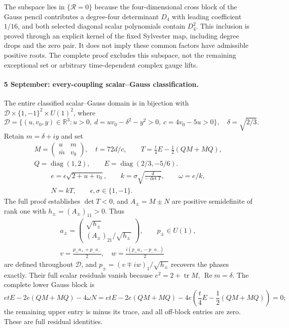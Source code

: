 \documentclass[10pt,letterpaper]{article}
\begin{document}
The subspace lies in $\{\mathscr R=0\}$ because the four-dimensional
cross block of the Gauss pencil contributes a degree-four determinant
$D_4$ with leading coefficient $1/16$, and both selected diagonal scalar
polynomials contain $D_4^2$. This inclusion is proved through an explicit
kernel of the fixed Sylvester map, including degree drops and the zero
pair. It does not imply these common factors have admissible positive roots.
The complete proof excludes this subspace, not the remaining exceptional
set or arbitrary time-dependent complex gauge lifts.

\paragraph{5 September: every-coupling scalar--Gauss classification.}
The entire classified scalar--Gauss domain is in bijection with
$\mathcal D\times\{1,-1\}^2\times U(1)^2$, where
\[
 \mathcal D=\{(u,v_0,y)\in\mathbb R^3:
 u>0,\ d=uv_0-\delta^2-y^2>0,\ c=4v_0-5u>0\},\quad
 \delta=\sqrt{2/3}.
\]
Retain $m=\delta+iy$ and set
\[
 \begin{gathered}
 M=\begin{pmatrix}u&m\\\bar m&v_0\end{pmatrix},\quad t=72d/c,\qquad
 T=\frac t4E-\frac12(QM+MQ),\\
 Q=\operatorname{diag}(1,2),\qquad E=\operatorname{diag}(2/3,-5/6).
 \end{gathered}
\]
\[
 \begin{gathered}
 e=\epsilon\sqrt{2+u+v_0},\qquad
 k=\sigma\sqrt{\frac d{-\det T}},\qquad
 \omega=e/k,\\
 N=kT,\qquad \epsilon,\sigma\in\{1,-1\}.
 \end{gathered}
\]
The full proof establishes $\det T<0$, and $A_\pm=M\pm N$ are
positive semidefinite of rank one with $h_\pm=(A_\pm)_{11}>0$. Thus
\[
 \begin{gathered}
 a_\pm=\begin{pmatrix}\sqrt{h_\pm}\\(A_\pm)_{21}/\sqrt{h_\pm}\end{pmatrix},\qquad
 p_\pm\in U(1),\\
 v=\frac{p_+a_++p_-a_-}2,\quad
 w=\frac{i(p_+a_+-p_-a_-)}2
 \end{gathered}
\]
are defined throughout $\mathcal D$, and
$p_\pm=(v\mp iw)_1/\sqrt{h_\pm}$ recovers the phases exactly.
Their full scalar residuals vanish because
$e^2=2+\operatorname{tr}M$, $\operatorname{Re}m=\delta$.
The complete lower Gauss block is
\[
 etE-2e(QM+MQ)-4\omega N
 =etE-2e(QM+MQ)-4e\left(\frac t4E-\frac12(QM+MQ)\right)=0;
\]
the remaining upper entry is minus its trace, and all off-block
entries are zero. These are full residual identities.
\end{document}
